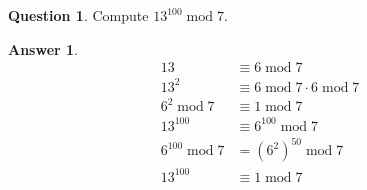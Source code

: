 \documentclass[article, 12pt]{article}
\theoremstyle{definition}
\newtheorem{question}{Question}
\newtheorem{answer}{Answer}
\newcommand{\Mod}[1]{\;\mathrm{mod}\; #1} %
\begin{document}
    \begin{question}
        Compute $13^{100}\Mod{7}$.
    \end{question}
    \begin{answer}
        \begin{align*}
            13 &\equiv 6 \Mod{7} \\
            13^2 &\equiv 6 \Mod{7} \cdot 6 \Mod{7} \\
            6^2 \Mod{7} &\equiv 1 \Mod{7} \\
            13^{100} &\equiv 6^{100} \Mod 7 \\
            6^{100} \Mod {7} &= (6^2)^{50} \Mod{7} \\
            13^{100} &\equiv 1 \Mod{7}
        \end{align*}
    \end{answer}
\end{document}
